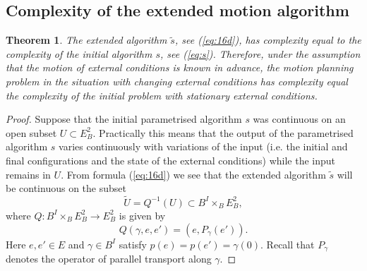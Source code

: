 \documentclass[11pt]{amsart}
\newtheorem{theorem}{Theorem}%
\begin{document}
{%
%


\subsection{Complexity of the extended motion algorithm} \label{27} 
\begin{theorem}\label{comp}
The extended algorithm $\tilde s$, see (\ref{eq:16d}), has complexity equal to the complexity of the initial algorithm $s$, see (\ref{eq:s}). 
Therefore, under the assumption that the motion of external conditions is known in advance, the motion planning problem in the situation with changing external conditions has complexity equal the complexity of the initial problem with stationary external conditions.
\end{theorem}
\begin{proof}
Suppose that the initial parametrised algorithm $s$ was continuous on an open subset 
$U\subset E^2_B$. Practically this means that the output of the parametrised algorithm $s$ varies continuously with variations of the input 
(i.e. the initial and final configurations and the state of the external conditions) while the input remains in $U$. 
From formula (\ref{eq:16d}) we see that the extended algorithm $\tilde s$ will be continuous on the subset 
$$
\tilde U= Q^{-1}(U)\subset B^I\times_B E^2_B,
$$
where $Q: B^I\times_B E^2_B\to E^2_B$ is given by 
$$Q(\gamma, e, e')=(e, P_\gamma(e')).$$
Here $e, e'\in E$ and $\gamma\in B^I$ satisfy $p(e)=p(e')=\gamma(0)$. Recall that $P_\gamma$ denotes the operator of parallel transport along $\gamma$. 


\end{proof}}
\end{document}
